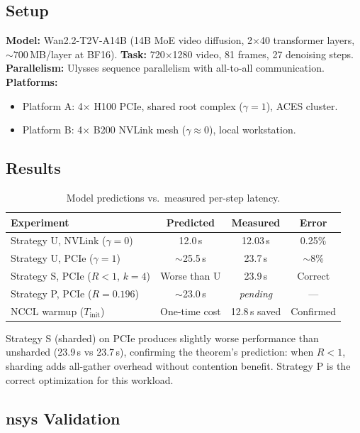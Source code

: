 \documentclass{article}
\begin{document}
\subsection{Setup}

\textbf{Model:} Wan2.2-T2V-A14B (14B MoE video diffusion, 2$\times$40 transformer layers, ${\sim}700$\,MB/layer at BF16). \textbf{Task:} 720$\times$1280 video, 81 frames, 27 denoising steps. \textbf{Parallelism:} Ulysses sequence parallelism with all-to-all communication. \textbf{Platforms:}
\begin{itemize}
    \item Platform A: 4$\times$ H100 PCIe, shared root complex ($\gamma = 1$), ACES cluster.
    \item Platform B: 4$\times$ B200 NVLink mesh ($\gamma \approx 0$), local workstation.
\end{itemize}

\subsection{Results}

\begin{table}[h]
\centering
\caption{Model predictions vs.\ measured per-step latency.}
\label{tab:results}
\begin{tabular}{@{}lccc@{}}
\toprule
\textbf{Experiment} & \textbf{Predicted} & \textbf{Measured} & \textbf{Error} \\
\midrule
Strategy U, NVLink ($\gamma{=}0$) & 12.0\,s & 12.03\,s & 0.25\% \\
Strategy U, PCIe ($\gamma{=}1$)   & ${\sim}$25.5\,s & 23.7\,s & ${\sim}$8\% \\
Strategy S, PCIe ($R{<}1$, $k{=}4$) & Worse than U & 23.9\,s & Correct \\
Strategy P, PCIe ($R{=}0.196$)    & ${\sim}$23.0\,s & \emph{pending} & --- \\
NCCL warmup ($T_{\text{init}}$)   & One-time cost & 12.8\,s saved & Confirmed \\
\bottomrule
\end{tabular}
\end{table}

Strategy S (sharded) on PCIe produces slightly worse performance than unsharded (23.9\,s vs 23.7\,s), confirming the theorem's prediction: when $R < 1$, sharding adds all-gather overhead without contention benefit. Strategy P is the correct optimization for this workload.

\subsection{nsys Validation}
\end{document}
